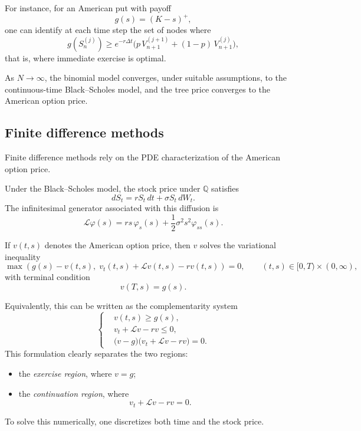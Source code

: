 \documentclass[11pt]{article}
\newcommand{\Qbb}{\mathbb{Q}}
\theoremstyle{definition}
\theoremstyle{plain}
\begin{document}
For instance, for an American put with payoff
\[
g(s)=(K-s)^+,
\]
one can identify at each time step the set of nodes where
\[
g\!\left(S_n^{(j)}\right)
\ge
e^{-r\Delta t}
\big(
p\,V_{n+1}^{(j+1)} + (1-p)\,V_{n+1}^{(j)}
\big),
\]
that is, where immediate exercise is optimal.

\medskip

As \(N\to\infty\), the binomial model converges, under suitable
assumptions, to the continuous-time Black--Scholes model, and the tree
price converges to the American option price.

\subsection{Finite difference methods}

Finite difference methods rely on the PDE characterization of the
American option price.

Under the Black--Scholes model, the stock price under \(\Qbb\) satisfies
\[
dS_t = rS_t\,dt + \sigma S_t\,dW_t.
\]
The infinitesimal generator associated with this diffusion is
\[
\mathcal L \varphi(s)
=
rs\,\varphi_s(s) + \frac12 \sigma^2 s^2 \varphi_{ss}(s).
\]

If \(v(t,s)\) denotes the American option price, then \(v\) solves the
variational inequality
\[
\max\!\left(
g(s)-v(t,s),\;
v_t(t,s)+\mathcal L v(t,s)-r v(t,s)
\right)=0,
\qquad (t,s)\in[0,T)\times(0,\infty),
\]
with terminal condition
\[
v(T,s)=g(s).
\]

Equivalently, this can be written as the complementarity system
\[
\left\{
\begin{aligned}
&v(t,s)\ge g(s),\\
&v_t + \mathcal L v - r v \le 0,\\
&\big(v-g\big)\big(v_t+\mathcal L v-rv\big)=0.
\end{aligned}
\right.
\]
This formulation clearly separates the two regions:
\begin{itemize}[leftmargin=1.4em]
\item the \emph{exercise region}, where \(v=g\);
\item the \emph{continuation region}, where
\[
v_t+\mathcal L v-rv=0.
\]
\end{itemize}

\medskip

To solve this numerically, one discretizes both time and the stock price.
\end{document}
